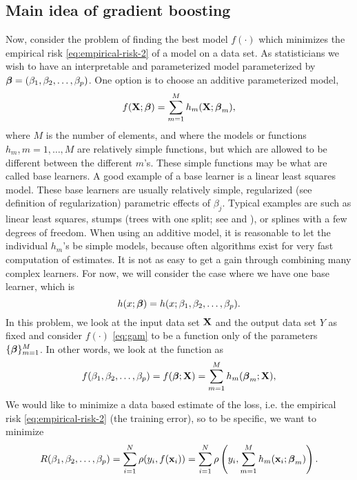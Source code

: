 \subsection{Main idea of gradient boosting}
Now, consider the problem of finding the best model $f(\cdot)$ which minimizes the empirical risk \eqref{eq:empirical-risk-2} of a model on a data set. As statisticians we wish to have an interpretable and parameterized model parameterized by $\boldsymbol{\beta}=(\beta_1,\beta_2,\ldots,\beta_p)$. One option is to choose an additive parameterized model,
\begin{equation*}\label{gam}
    f(\mathbf{X};\boldsymbol{\beta})=\sum_{m=1}^M h_{m}(\mathbf{X};\boldsymbol{\beta}_m),
\end{equation*}
where $M$ is the number of elements, and where the models or functions $h_m,m=1,\ldots,M$ are relatively simple functions, but which are allowed to be different between the different $m$'s. These simple functions may be what are called base learners. A good example of a base learner is a linear least squares model. These base learners are usually relatively simple, regularized (see definition of regularization) parametric effects of $\beta_j$. Typical examples are such as linear least squares, stumps (trees with one split; see \citet{buhlmann2007} and \citet{ESL}), or splines with a few degrees of freedom. When using an additive model, it is reasonable to let the individual $h_m$'s be simple models, because often algorithms exist for very fast computation of estimates. It is not as easy to get a gain through combining many complex learners. For now, we will consider the case where we have one base learner, which is
\begin{equation*}
    h(x;\boldsymbol{\beta})=h(x;\beta_1,\beta_2,\ldots,\beta_p).
\end{equation*}
In this problem, we look at the input data set $\mathbf{X}$ and the output data set $Y$ as fixed and consider $f(\cdot)$ \eqref{eq:gam} to be a function only of the parameters $\{\boldsymbol{\beta}\}_{m=1}^M$. In other words, we look at the function as
\begin{equation*}
    f(\beta_1,\beta_2,\ldots,\beta_p)=f(\boldsymbol{\beta};\mathbf{X})=\sum_{m=1}^M h_{m}(\boldsymbol{\beta}_m;\mathbf{X}),
\end{equation*}
We would like to minimize a data based estimate of the loss, i.e. the empirical risk \eqref{eq:empirical-risk-2} (the training error), so to be specific, we want to minimize
\begin{equation}\label{eq:empirical-risk}
    R(\beta_1,\beta_2,\ldots,\beta_p)=\sum_{i=1}^N \rho(y_i,f(\mathbf{x}_i))=\sum_{i=1}^N \rho\left(y_i,\sum_{m=1}^M h_{m}(\mathbf{x}_i;\boldsymbol{\beta}_m)\right).
\end{equation}

